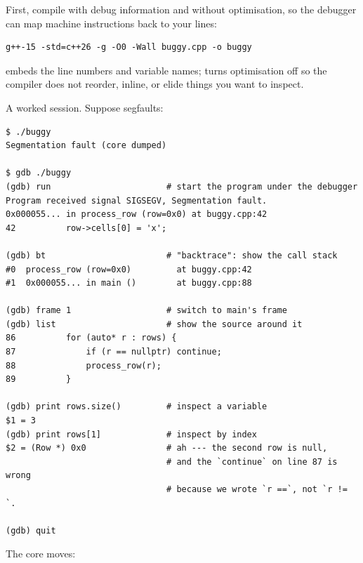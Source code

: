 First, compile with debug information and without optimisation, so
the debugger can map machine instructions back to your lines:

\begin{lstlisting}[style=shell]
g++-15 -std=c++26 -g -O0 -Wall buggy.cpp -o buggy
\end{lstlisting}

 embeds the line numbers and variable names;
 turns optimisation off so the compiler does not
reorder, inline, or elide things you want to inspect.

A worked session. Suppose  segfaults:

\begin{lstlisting}[style=shell]
$ ./buggy
Segmentation fault (core dumped)

$ gdb ./buggy
(gdb) run                       # start the program under the debugger
Program received signal SIGSEGV, Segmentation fault.
0x000055... in process_row (row=0x0) at buggy.cpp:42
42          row->cells[0] = 'x';

(gdb) bt                        # "backtrace": show the call stack
#0  process_row (row=0x0)         at buggy.cpp:42
#1  0x000055... in main ()        at buggy.cpp:88

(gdb) frame 1                   # switch to main's frame
(gdb) list                      # show the source around it
86          for (auto* r : rows) {
87              if (r == nullptr) continue;
88              process_row(r);
89          }

(gdb) print rows.size()         # inspect a variable
$1 = 3
(gdb) print rows[1]             # inspect by index
$2 = (Row *) 0x0                # ah --- the second row is null,
                                # and the `continue` on line 87 is wrong
                                # because we wrote `r ==`, not `r != `.

(gdb) quit
\end{lstlisting}

The core moves:


